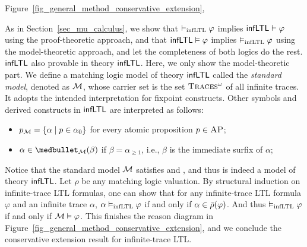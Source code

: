 \documentclass{amsart}
\begin{document}
Figure~\ref{fig_general_method_conservative_extension},
%


As in Section~\ref{sec_mu_calculus}, we show
that
$\vdash_{\mathrm{infLTL}} \varphi$ implies $\mathsf{infLTL} \vdash \varphi$ using the
proof-theoretic approach,
and that
$\mathsf{infLTL} \vDash \varphi$ implies $\vDash_{\mathrm{infLTL}}\varphi$ using the
model-theoretic approach,
and let the completeness of both logics do the rest.
$\mathsf{infLTL}$
also provable in theory $\mathsf{infLTL}$.
Here, we only show the model-theoretic part.
We define a matching logic model of theory $\mathsf{infLTL}$ called the \emph{standard
	model},
denoted as $\mathcal{M}$, whose carrier set is the set $\textsc{Traces$^\omega$}$ of all infinite
traces.
It adopts the intended interpretation for fixpoint constructs.
Other symbols and derived constructs in $\mathsf{infLTL}$ are interpreted as follows:
\begin{itemize}
	\item $p_{\mathcal{M}} = \{ \alpha \mid p \in \alpha_0 \}$ for every atomic proposition $p
	\in \textsc{AP}$;
	\item $\alpha \in \snext_\MM(\beta)$ if $\beta = \alpha_{\ge 1}$, i.e.,
	$\beta$ is the immediate surfix of $\alpha$;
\end{itemize}
Notice that the standard model $\mathcal{M}$ satisfies \Lin and \Fin, and thus is indeed
a model
of theory $\mathsf{infLTL}$.
Let $\rho$ be any matching logic valuation.
By structural induction on infinite-trace LTL formulas,
one can show that for any infinite-trace LTL formula $\varphi$ and an infinite
trace $\alpha$,
$\alpha \vDash_{\mathrm{infLTL}} \varphi$ if and only if $\alpha \in \bar{\rho}(\varphi)$.
And thus $\vDash_{\mathrm{infLTL}} \varphi$ if and only if $\mathcal{M} \vDash \varphi$.
This finishes the reason diagram in
Figure~\ref{fig_general_method_conservative_extension},
and we conclude the conservative extension result for infinite-trace LTL.
\end{document}
